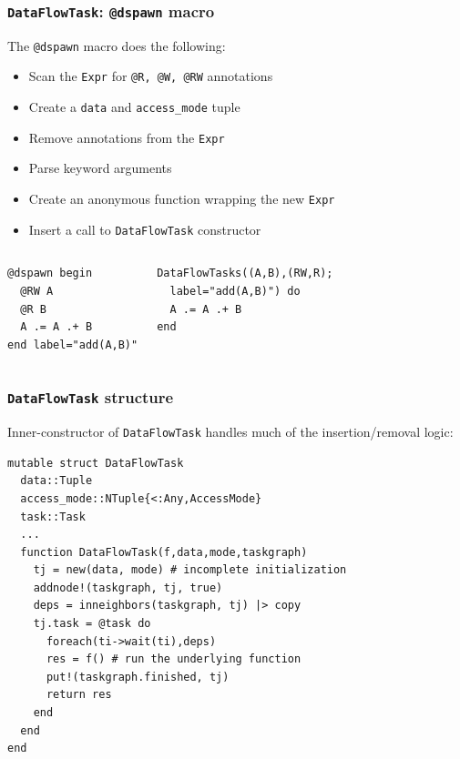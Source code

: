 \documentclass{beamer}
\begin{document}
\begin{frame}[fragile]

\frametitle{\texttt{DataFlowTask}: \texttt{@dspawn} macro}

The \texttt{@dspawn} macro does the following:

\begin{itemize}
    \item Scan the \texttt{Expr} for \texttt{@R, @W, @RW} annotations
    \item Create a \texttt{data} and \texttt{access_mode}
    tuple
    \item Remove annotations from the \texttt{Expr}
    \item Parse keyword arguments    
    \item Create an anonymous function wrapping the new \texttt{Expr}
    \item Insert a call to \texttt{DataFlowTask} constructor
\end{itemize}

\begin{columns}

\begin{exampleblock}{}    
\begin{verbatim}
@dspawn begin
  @RW A
  @R B
  A .= A .+ B
end label="add(A,B)"
\end{verbatim}
\end{exampleblock}


\begin{exampleblock}{}    
\begin{verbatim}
DataFlowTasks((A,B),(RW,R);
  label="add(A,B)") do 
  A .= A .+ B
end 
\end{verbatim}
\end{exampleblock}

\end{columns}
%

\end{frame} 

\begin{frame}[fragile]

\frametitle{\texttt{DataFlowTask} structure}

\small{\alert{Inner-constructor of \texttt{DataFlowTask} handles much of
the insertion/removal logic:}}

\hrulefill
\begin{verbatim}
mutable struct DataFlowTask
  data::Tuple
  access_mode::NTuple{<:Any,AccessMode}
  task::Task
  ...
  function DataFlowTask(f,data,mode,taskgraph)
    tj = new(data, mode) # incomplete initialization
    addnode!(taskgraph, tj, true) 
    deps = inneighbors(taskgraph, tj) |> copy
    tj.task = @task do
      foreach(ti->wait(ti),deps)
      res = f() # run the underlying function
      put!(taskgraph.finished, tj)
      return res
    end
  end
end
\end{verbatim}

\end{frame} 
\end{document}
